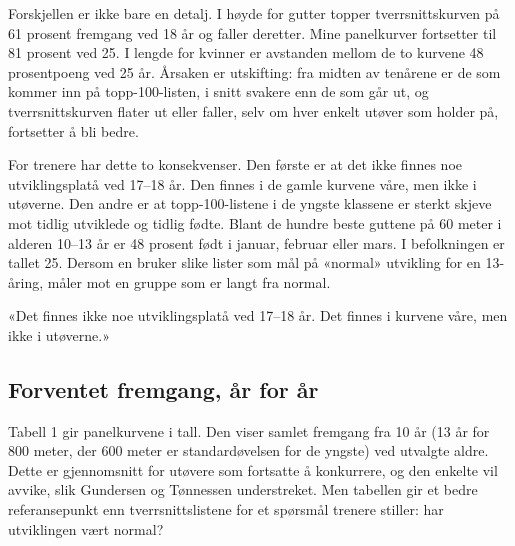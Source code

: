Forskjellen er ikke bare en detalj. I høyde for gutter topper tverrsnittskurven på
61 prosent fremgang ved 18 år og faller deretter. Mine panelkurver fortsetter til
81 prosent ved 25. I lengde for kvinner er avstanden mellom de to kurvene 48
prosentpoeng ved 25 år. Årsaken er utskifting: fra midten av tenårene er de
som kommer inn på topp-100-listen, i snitt svakere enn de som går ut, og
tverrsnittskurven flater ut eller faller, selv om hver enkelt utøver som
holder på, fortsetter å bli bedre.

For trenere har dette to konsekvenser. Den første er at det ikke finnes noe
utviklingsplatå ved 17--18 år. Den finnes i de gamle kurvene våre, men ikke i utøverne.
Den andre er at topp-100-listene i de yngste klassene er sterkt skjeve mot
tidlig utviklede og tidlig fødte. Blant de hundre beste guttene på 60 meter i
alderen 10--13 år er 48 prosent født i januar, februar eller mars. I
befolkningen er tallet 25. Dersom en bruker slike lister som mål på «normal»
utvikling for en 13-åring, måler mot en gruppe som er langt fra normal.

\begin{sitat}

«Det finnes ikke noe utviklingsplatå ved 17--18 år. Det finnes i kurvene våre, men ikke i utøverne.»

\end{sitat}

\subsection{Forventet fremgang, år for år}\label{forventet-fremgang-uxe5r-for-uxe5r}

Tabell 1 gir panelkurvene i tall. Den viser samlet fremgang fra 10 år (13 år
for 800 meter, der 600 meter er standardøvelsen for de yngste) ved utvalgte
aldre. Dette er gjennomsnitt for utøvere som fortsatte å konkurrere, og den
enkelte vil avvike, slik Gundersen og Tønnessen understreket. Men tabellen
gir et bedre referansepunkt enn tverrsnittslistene for et spørsmål trenere stiller: har utviklingen vært normal?


